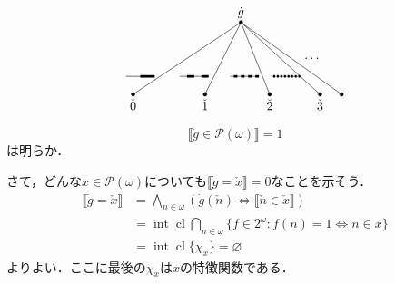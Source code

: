\documentclass[uplatex,dvipdfmx]{jsarticle}
\newcommand{\PP}{\mathcal{P}}
\newcommand{\intr}{\operatorname{int}}
\newcommand{\cl}{\operatorname{cl}}
\renewcommand\emptyset{\varnothing}
\newcommand{\truth}[1] {\llbracket #1 \rrbracket}
\theoremstyle{definition}
\begin{document}
\[
\begin{tikzpicture}
\draw (0,0) -- (-3,-2);
\draw (0,0) -- (-1,-2);
\draw (0,0) -- (0.8,-2);
\draw (0,0) -- (2.2,-2);
\draw (0,0) -- (2.8,-2);

\draw [fill=black] (0,0) circle (0.05) node[above] {$\dot{g}$};
\draw [fill=black] (-3,-2) circle (0.05) node[below] {$\check{0}$};
\draw [fill=black] (-1,-2) circle (0.05) node[below] {$\check{1}$};
\draw [fill=black] (0.8,-2) circle (0.05) node[below] {$\check{2}$};
\draw [fill=black] (2.2,-2) circle (0.05) node[below] {$\check{3}$};
\draw [fill=black] (2.8,-2) circle (0.05);
\node at (2,-1) {$\dots$};

\begin{scope}[shift={(-3.2,-1.5)}, scale=0.8]
\draw (0,0) -- (1,0);
\draw[line width=0.7mm] (0.5,0) -- (1,0);
\end{scope}

\begin{scope}[shift={(-1.7,-1.5)}, scale=0.8]
\draw (0,0) -- (1,0);
\draw[line width=0.7mm] (0.25,0) -- (0.5,0);
\draw[line width=0.7mm] (0.75,0) -- (1,0);
\end{scope}

\begin{scope}[shift={(-0.3,-1.5)}, scale=0.8]
\draw (0,0) -- (1,0);
\draw[line width=0.7mm] (0.125,0) -- (0.25,0);
\draw[line width=0.7mm] (0.375,0) -- (0.5,0);
\draw[line width=0.7mm] (0.625,0) -- (0.75,0);
\draw[line width=0.7mm] (0.875,0) -- (1,0);
\end{scope}

\begin{scope}[shift={(0.85,-1.5)}, scale=0.8]
\draw (0,0) -- (1,0);
\draw[line width=0.7mm] (0.0625,0) -- (0.125,0);
\draw[line width=0.7mm] (0.1875,0) -- (0.25,0);
\draw[line width=0.7mm] (0.3125,0) -- (0.375,0);
\draw[line width=0.7mm] (0.4375,0) -- (0.5,0);
\draw[line width=0.7mm] (0.5625,0) -- (0.625,0);
\draw[line width=0.7mm] (0.6875,0) -- (0.75,0);
\draw[line width=0.7mm] (0.8125,0) -- (0.875,0);
\draw[line width=0.7mm] (0.9375,0) -- (1.0,0);
\end{scope}
\end{tikzpicture}
\]


\[
\truth{\dot{g} \in \PP(\omega)} = 1
\]
は明らか．

さて，どんな$x \in \PP(\omega)$についても$\truth{\dot{g} = \check{x}} = 0$なことを示そう．
\begin{align*}
\truth{\dot{g} = \check{x}} &= \bigwedge_{n \in \omega} (\dot{g}(\check{n}) \Leftrightarrow \truth{\check{n} \in \check{x}}) \\
&= \intr \cl \bigcap_{n \in \omega} \{ f \in 2^\omega : f(n) = 1 \iff n \in x \} \\
&= \intr \cl \{\chi_x\} = \emptyset
\end{align*}
よりよい．ここに最後の$\chi_x$は$x$の特徴関数である．
\end{document}
